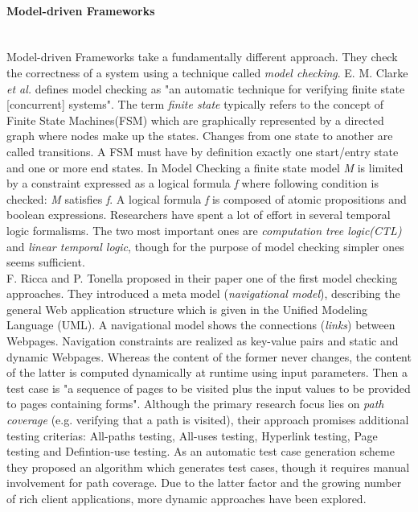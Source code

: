 \documentclass[12pt, notitlepage]{article}
\begin{document}
\paragraph{Model-driven Frameworks} ~\\
Model-driven Frameworks take a fundamentally different approach. They check the correctness of a system using a technique called \textit{model checking}.
E. M. Clarke \textit{et al.}\cite{model-checking} defines model checking as "an automatic technique for verifying finite state [concurrent] systems".
The term \textit{finite state} typically refers to the concept of Finite State Machines(FSM)\cite{finite-state-machines} which are graphically represented by a directed graph where nodes make up the states. Changes from one state to another are called transitions. A FSM must have by definition exactly one start/entry state and one or more end states.  In Model Checking a finite state model \textit{M} is limited by a constraint expressed as a logical formula \textit{f} where
following condition is checked: \textit{M} satisfies \textit{f}. A logical formula \textit{f} is composed of atomic propositions and boolean
expressions\cite{model-checking}. Researchers have spent a lot of effort in several temporal logic formalisms. The two most important ones are
\textit{computation tree logic(CTL)} and \textit{linear temporal logic}, though for the purpose of model checking simpler
ones seems sufficient\cite{dynamic-testing-web-applications}. \\
F. Ricca and P. Tonella proposed in their paper\cite{web-whiteBox-testing} one of the first model checking approaches. They introduced a meta model (\textit{navigational model}), describing the general Web application structure which is given in the Unified Modeling Language (UML)\cite{uml}.
A navigational model shows the connections (\textit{links}) between Webpages. Navigation constraints are realized as key-value pairs and static and dynamic Webpages. 
Whereas the content of the former never changes, the content of the latter is computed dynamically at runtime using input parameters. Then a test case is
"a sequence of pages to be visited plus the input values to be provided to pages containing forms"\cite{web-whiteBox-testing}. Although the primary research focus
lies on \textit{path coverage} (e.g. verifying that a path is visited), their approach promises additional testing criterias: All-paths testing, All-uses testing,
Hyperlink testing, Page testing and Defintion-use testing. As an automatic test case generation scheme they proposed an algorithm  which generates test cases, though it requires manual involvement for path coverage. Due to the latter factor and the growing number of rich client applications, more dynamic approaches have been explored.\\
\end{document}
